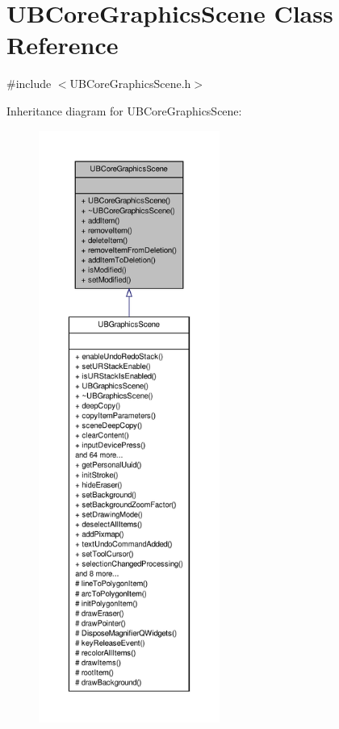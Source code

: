 \hypertarget{class_u_b_core_graphics_scene}{\section{U\-B\-Core\-Graphics\-Scene Class Reference}
\label{d3/db1/class_u_b_core_graphics_scene}
}


{\ttfamily \#include $<$U\-B\-Core\-Graphics\-Scene.\-h$>$}



Inheritance diagram for U\-B\-Core\-Graphics\-Scene\-:
\nopagebreak
\begin{figure}[H]
\begin{center}
\leavevmode
\includegraphics[height=550pt]{d8/d90/class_u_b_core_graphics_scene__inherit__graph}
\end{center}
\end{figure}


